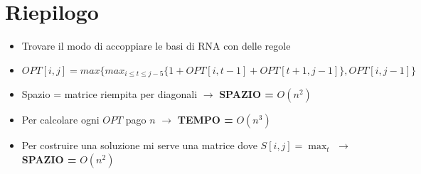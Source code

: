 \section{Riepilogo}

\begin{itemize}
  \item
        Trovare il modo di accoppiare le basi di RNA con delle regole
  \item
        $OPT[i,j] = max\{ max_{i \le t \le j-5} \{ 1 + OPT[i, t-1] + OPT[t+1, j-1] \}, OPT[i, j-1] \}$
  \item
        Spazio = matrice riempita per diagonali $\rightarrow$ \textbf{SPAZIO
          =} $O(n^2)$
  \item
        Per calcolare ogni $OPT$ pago $n$ $\rightarrow$ \textbf{TEMPO =}
        $O(n^3)$
  \item
        Per costruire una soluzione mi serve una matrice dove
        $S[i,j] = \max_t$ $\rightarrow$ \textbf{SPAZIO =} $O(n^2)$
\end{itemize}
